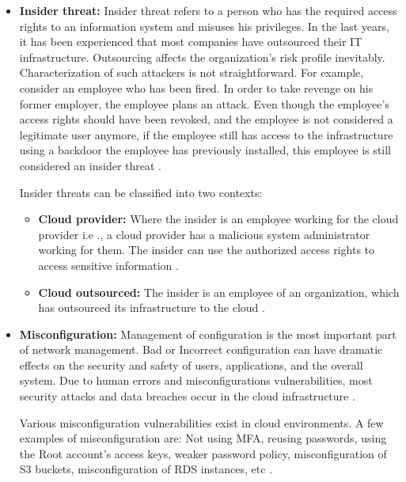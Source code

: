 \begin{itemize}
    \item \textbf{Insider threat:} Insider threat refers to a person who has the required access rights to an
    information system and misuses his privileges.
    In the last years, it has been experienced that most companies have outsourced their IT infrastructure.
    Outsourcing affects the organization’s risk profile inevitably.
    Characterization of such attackers is not straightforward.
    For example, consider an employee who has been fired.
    In order to take revenge on his former employer, the
    employee plans an attack.
    Even though the employee's access rights should have been revoked, and the employee is not considered a
    legitimate user anymore, if the employee still has
    access to the infrastructure using a backdoor the employee has previously installed, this employee is still considered an insider threat \cite{56}.

    Insider threats can be classified into two contexts:
    \begin{itemize}
        \item \textbf{Cloud provider:} Where the insider
        is an employee working for the cloud provider i.e
        ., a cloud provider has a malicious system
        administrator working for them.
        The insider can use the authorized access
        rights to access sensitive information \cite{56}.
    \end{itemize}
    \begin{itemize}
        \item \textbf{Cloud outsourced:} The insider is an employee of an organization, which has outsourced its
        infrastructure to the cloud \cite{56}.
    \end{itemize}
\end{itemize}

\begin{itemize}
    \item \textbf{Misconfiguration:} Management of configuration is the most important part of network management.
    Bad or Incorrect configuration can have dramatic effects on the security and safety of users, applications, and the overall system.
    Due to human errors and misconfigurations vulnerabilities, most security attacks and data breaches occur in the cloud infrastructure \cite{44}.

    Various misconfiguration vulnerabilities exist in cloud environments.
    A few examples of misconfiguration are: Not
    using MFA, reusing passwords, using the Root account’s access keys, weaker password policy, misconfiguration of S3
    buckets,  misconfiguration of RDS
    instances, etc \cite{55}.
\end{itemize}

